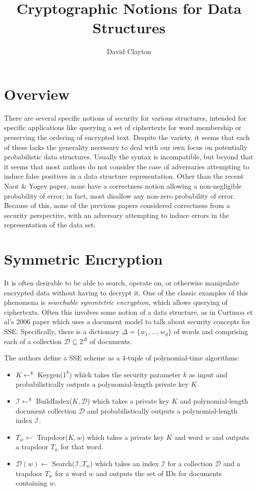 \documentclass[11pt, pdftex]{article}
\title{Cryptographic Notions for Data Structures}
\author{David Clayton}
\begin{document}
\maketitle

\section{Overview}

There are several specific notions of security for various structures, intended for specific applications like querying a set of ciphertexts for word membership or preserving the ordering of encrypted text. Despite the variety, it seems that each of these lacks the generality necessary to deal with our own focus on potentially probabilistic data structures. Usually the syntax is incompatible, but beyond that it seems that most authors do not consider the case of adversaries attempting to induce false positives in a data structure representation. Other than the recent Naor \& Yogev paper, none have a correctness notion allowing a non-negligible probability of error; in fact, most disallow any non-zero probability of error. Because of this, none of the previous papers considered correctness from a security perspective, with an adversary attempting to induce errors in the representation of the data set.

\section{Symmetric Encryption}

It is often desirable to be able to search, operate on, or otherwise manipulate encrypted data without having to decrypt it. One of the classic examples of this phenomena is {\em searchable symmtetric encryption}, which allows querying of ciphertexts. Often this involves some notion of a data structure, as in Curtmoa et al's 2006 paper \cite{sse} which uses a document model to talk about security concepts for SSE. Specifically, there is a dictionary $\Delta = \{w_1, \ldots, w_d\}$ of words and comprising each of a collection $\mathcal{D} \subseteq 2^\Delta$ of documents.

The authors define a SSE scheme as a 4-tuple of polynomial-time algorithms:

\begin{itemize}
	\item $K \gets^\$$ Keygen($1^k$) which takes the security parameter $k$ as input and probabilistically outputs a polynomial-length private key $K$.
	\item $\mathcal{I} \gets^\$$ BuildIndex($K,\mathcal{D}$) which takes a private key $K$ and polynomial-length document collection $\mathcal{D}$ and probabilistically outputs a polynomial-length index $\mathcal{I}$.
	\item $T_w \gets$ Trapdoor($K,w$) which takes a private key $K$ and word $w$ and outputs a trapdoor $T_w$ for that word.
	\item $\mathcal{D}(w) \gets$ Search($\mathcal{I},T_w$) which takes an index $\mathcal{I}$ for a collection $\mathcal{D}$ and a trapdoor $T_w$ for a word $w$ and outputs the set of IDs for documents containing $w$.
\end{itemize}
\end{document}
